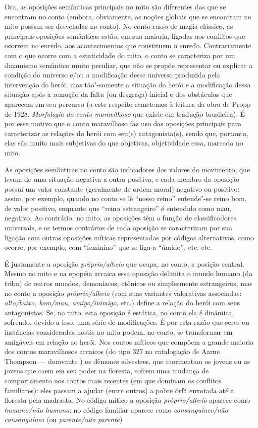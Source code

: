 {Ora, as oposições semânticas principais no mito são diferentes das que
se encontram no conto (embora, obviamente, as noções globais que se
encontram no mito possam ser desveladas no conto). No conto russo de
magia clássico, as principais oposições semânticas estão, em sua
maioria, ligadas aos conflitos que ocorrem no enredo, aos
acontecimentos que constituem o enredo. Contrariamente com o que ocorre
com a estaticidade do mito, o conto se caracteriza por um dinamismo
semântico muito peculiar, que não se propõe representar ou explicar a
condição do universo e/ou a modificação desse universo produzida pela
intervenção do herói, mas tão"-somente a situação do herói e a
modificação dessa situação após a remoção da falta (ou desgraça)
inicial e dos obstáculos que aparecem em seu percurso (a este respeito
remetemos à leitura da obra de Propp de 1928, \emph{Morfologia do conto
maravilhoso} que existe em tradução brasileira). É por esse motivo que o
conto maravilhoso faz uso das oposições principais para caracterizar as
relações do herói com seu(s) antagonista(s), sendo que, portanto, elas
são muito mais subjetivas do que objetivas, objetividade essa, marcada
no mito.

As oposições semânticas no conto são indicadores dos valores do
movimento, que levam de uma situação negativa a outra positiva, e cada
membro da oposição possui um valor constante (geralmente de ordem
moral) negativo ou positivo: assim, por exemplo, quando no conto se lê ``nosso reino'' entende"-se reino bom, de valor positivo, enquanto que ``reino estrangeiro'' é entendido como mau, negativo. Ao contrário, no
mito, as oposições têm a função de classificadores universais, e os
termos contrários de cada oposição se caracterizam por sua ligação com
outras oposições míticas representadas por códigos alternativos, como
ocorre, por exemplo, com ``feminino'' que se liga a ``úmido'', etc.
etc.

É justamente a oposição \emph{próprio/alheio} que ocupa, no conto, a
posição central. Mesmo no mito e na epopéia arcaica essa oposição
delimita o mundo humano (da tribo) de outros mundos, demoníacos,
ctônicos ou simplesmente estrangeiros, mas no conto a
oposição \emph{próprio/alheio} (com suas variantes valorativas
associadas: \emph{alto/baixo, bom/mau,
amigo/inimigo}, etc.) define a relação do herói com seus
antagonistas. Se, no mito, esta oposição é estática, no conto ela é
dinâmica, sofrendo, devido a isso, uma série de modificações. É por esta
razão que seres ou instâncias consideradas hostis no mito podem, no
conto, se transformar em amigáveis em relação ao herói. Nos contos
míticos que compõem a grande maioria dos contos maravilhosos arcaicos
(do tipo 327 na catalogação de Aarne Thompson --- doravante ) os
dêmones silvestres, que atormentam os jovens ou as jovens que caem em
seu poder na floresta, sofrem uma mudança de comportamento nos contos
mais recentes (em que dominam os conflitos familiares): eles passam a
ajudar (entre outros) a pobre órfã enxotada até a floresta pela
madrasta. No código mítico a oposição \emph{próprio/alheio} aparece
como \emph{humano/não humano}; no código familiar aparece
como \emph{consanguíneo/não consanguíneo} (ou \emph{parente/não
parente})

}

